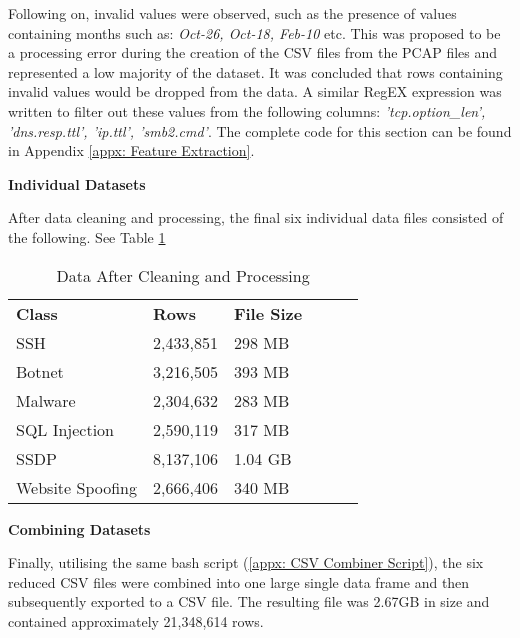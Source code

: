 \smallskip
Following on, invalid values were observed, such as the presence of values containing months such as: \textit{Oct-26, Oct-18, Feb-10} etc. This was proposed to be a processing error during the creation of the CSV files from the PCAP files and represented a low majority of the dataset. It was concluded that rows containing invalid values would be dropped from the data. A similar RegEX expression was written to filter out these values from the following columns: \textit{'tcp.option\_len', 'dns.resp.ttl', 'ip.ttl', 'smb2.cmd'}. The complete code for this section can be found in Appendix \ref{appx: Feature Extraction}.

\medskip

\textbf{Individual Datasets}

\smallskip
After data cleaning and processing, the final six individual data files consisted of the following. See Table \ref{tab:reduced_data}

\begin{table}[H]
\centering
\begin{tabular}{llllll}
\cline{1-3}
\textbf{Class}  & \textbf{Rows} & \textbf{File Size} &  &  &  \\ \cline{1-3}
SSH              & 2,433,851    & 298 MB               &  &  &  \\
Botnet           & 3,216,505     & 393 MB             &  &  &  \\
Malware          & 2,304,632     & 283 MB             &  &  &  \\
SQL Injection    & 2,590,119     & 317 MB             &  &  &  \\
SSDP             & 8,137,106     & 1.04 GB            &  &  &  \\
Website Spoofing & 2,666,406     & 340 MB            &  &  &  \\ \cline{1-3}
\end{tabular}
\caption{Data After Cleaning and Processing}
\label{tab:reduced_data}
\end{table}

\medskip

\textbf{Combining Datasets}

\smallskip
Finally, utilising the same bash script (\ref{appx: CSV Combiner Script}), the six reduced CSV files were combined into one large single data frame and then subsequently exported to a CSV file. The resulting file was 2.67GB in size and contained approximately 21,348,614 rows. 